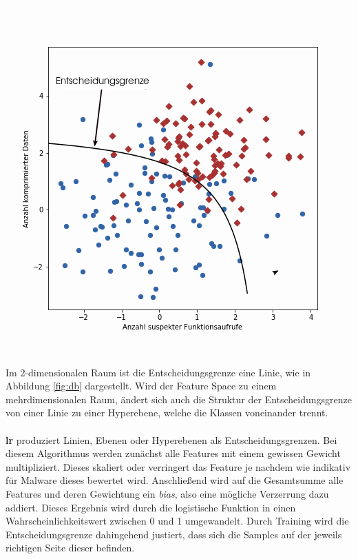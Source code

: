 \documentclass[
    12pt, %
    DIV10,
    ngerman, %
    a4paper, %
    oneside, %
    titlepage, %
    parskip=half, %
    headings=normal, %
    listof=totoc, %
    bibliography=totoc, %
    index=totoc, %
    captions=tableheading, %
    final %
]{scrreprt}
\begin{document}
\begin{center}
\includegraphics[scale=0.6]{img/db.png}
\label{fig:db}
\end{center}
Im 2-dimensionalen Raum ist die Entscheidungsgrenze eine Linie, wie in Abbildung \ref{fig:db} dargestellt. Wird der Feature Space zu einem mehrdimensionalen Raum, ändert sich auch die Struktur der Entscheidungsgrenze von einer Linie zu einer Hyperebene, welche die Klassen voneinander trennt.\\\\
\textbf{\acl{lr}} produziert Linien, Ebenen oder Hyperebenen als Entscheidungsgrenzen. Bei diesem Algorithmus werden zunächst alle Features mit einem gewissen Gewicht multipliziert. Dieses skaliert oder verringert das Feature je nachdem wie indikativ für Malware dieses bewertet wird. Anschließend wird auf die Gesamtsumme alle Features und deren Gewichtung ein \emph{bias}, also eine mögliche Verzerrung dazu addiert. Dieses Ergebnis wird durch die logistische Funktion in einen Wahrscheinlichkeitswert zwischen 0 und 1 umgewandelt. Durch Training wird die Entscheidungsgrenze dahingehend justiert, dass sich die Samples auf der jeweils richtigen Seite dieser befinden.\\\\
\end{document}
